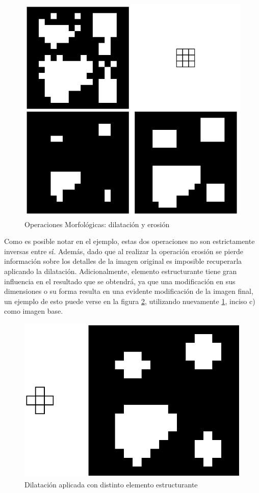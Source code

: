\begin{figure}[H]
\centering
\includegraphics[scale=0.53]{Figures/ErosDil_NoGrid.png}
    \caption{Operaciones Morfológicas: dilatación y erosión}
    \label{fig:Ero+Dil}
\end{figure}

Como es posible notar en el ejemplo, estas dos operaciones no son estrictamente inversas entre sí. Además, dado que al realizar la operación erosión se pierde información sobre los detalles de la imagen original es imposible recuperarla aplicando la dilatación. Adicionalmente, elemento estructurante tiene gran influencia en el resultado que se obtendrá, ya que una modificación en sus dimensiones o su forma resulta en una evidente modificación de la imagen final, un ejemplo de esto puede verse en la figura \ref{fig:Dil_ES2}, utilizando nuevamente  \ref{fig:Ero+Dil}, inciso c) como imagen base.

\begin{figure}[H]
\centering
\includegraphics[scale=0.25]{Figures/Dil_ES2.png}
    \caption{Dilatación aplicada con distinto elemento estructurante}
    \label{fig:Dil_ES2}
\end{figure}

